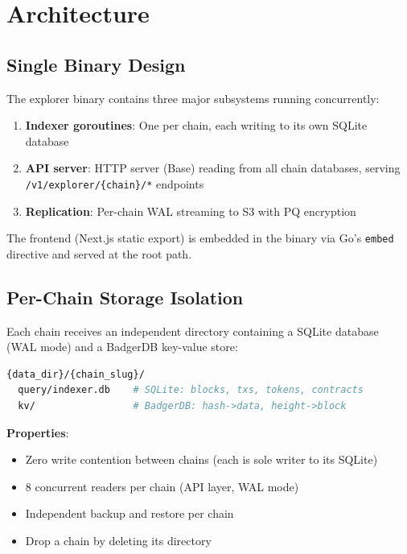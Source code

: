 \documentclass[11pt,a4paper]{article}
\begin{document}
\section{Architecture}

\subsection{Single Binary Design}

The explorer binary contains three major subsystems running concurrently:

\begin{enumerate}
  \item \textbf{Indexer goroutines}: One per chain, each writing to its own SQLite database
  \item \textbf{API server}: HTTP server (Base) reading from all chain databases, serving
        \texttt{/v1/explorer/\{chain\}/*} endpoints
  \item \textbf{Replication}: Per-chain WAL streaming to S3 with PQ encryption
\end{enumerate}

The frontend (Next.js static export) is embedded in the binary via Go's \texttt{embed}
directive and served at the root path.

\subsection{Per-Chain Storage Isolation}

Each chain receives an independent directory containing a SQLite database (WAL mode) and
a BadgerDB key-value store:

\begin{lstlisting}[language=bash]
{data_dir}/{chain_slug}/
  query/indexer.db    # SQLite: blocks, txs, tokens, contracts
  kv/                 # BadgerDB: hash->data, height->block
\end{lstlisting}

\textbf{Properties}:
\begin{itemize}
  \item Zero write contention between chains (each is sole writer to its SQLite)
  \item 8 concurrent readers per chain (API layer, WAL mode)
  \item Independent backup and restore per chain
  \item Drop a chain by deleting its directory
\end{itemize}
\end{document}
